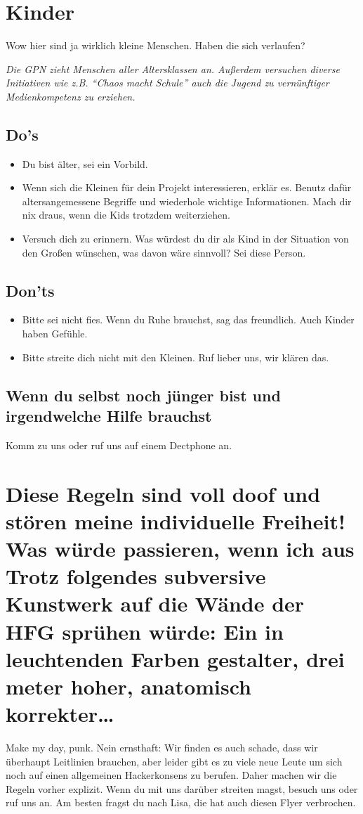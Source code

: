 \documentclass[10pt]{leaflet}
\begin{document}
\section{Kinder}
\label{sec-6}
 Wow hier sind ja wirklich kleine Menschen. Haben die sich verlaufen?


\emph{Die GPN zieht Menschen aller Altersklassen an. Außerdem versuchen
diverse Initiativen wie z.B. ``Chaos macht Schule'' auch die Jugend zu
vernünftiger Medienkompetenz zu erziehen.}

\subsection{Do's}
\label{sec-6-1}
\begin{itemize}
\item Du bist älter, sei ein Vorbild.
\item Wenn sich die Kleinen für dein Projekt interessieren, erklär
  es. Benutz dafür altersangemessene Begriffe und wiederhole wichtige
  Informationen. Mach dir nix draus, wenn die Kids trotzdem
  weiterziehen.
\item Versuch dich zu erinnern. Was würdest du dir als Kind in der
  Situation von den Großen wünschen, was davon wäre sinnvoll? Sei
  diese Person.
\end{itemize}


\subsection{Don'ts}
\label{sec-6-2}
\begin{itemize}
\item Bitte sei nicht fies. Wenn du Ruhe brauchst, sag das
  freundlich. Auch Kinder haben Gefühle.
\item Bitte streite dich nicht mit den Kleinen. Ruf lieber uns, wir klären
das.
\end{itemize}
\subsection{Wenn du selbst noch jünger bist und irgendwelche Hilfe brauchst}
Komm zu uns oder ruf uns auf einem Dectphone an.


\section{Diese Regeln sind voll doof und stören meine individuelle
  Freiheit! Was würde passieren, wenn ich aus Trotz folgendes
  subversive Kunstwerk auf die Wände der HFG sprühen würde: Ein in
  leuchtenden Farben gestalter, drei meter hoher, anatomisch
  korrekter\ldots{}}
\label{sec-7}
Make my day, punk. Nein ernsthaft: Wir finden es auch schade, dass wir
überhaupt Leitlinien brauchen, aber leider gibt es zu viele neue Leute
um sich noch auf einen allgemeinen Hackerkonsens zu berufen. Daher
machen wir die Regeln vorher explizit. Wenn du mit uns darüber
streiten magst, besuch uns oder ruf uns an. Am besten fragst du nach
Lisa, die hat auch diesen Flyer verbrochen.
\end{document}
